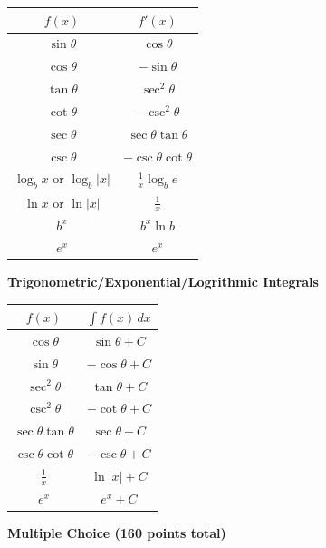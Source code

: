 \documentclass[12pt]{exam}
\newcommand{\<}{\langle}
\renewcommand{\>}{\rangle}
\begin{document}
\begin{center}
\begin{tabular}{c|c}
  \(f(x)\) & \(f'(x)\) \\\hline
  \(\sin\theta\) & \(\cos\theta\) \\
  \(\cos\theta\) & \(-\sin\theta\) \\
  \(\tan\theta\) & \(\sec^2\theta\) \\
  \(\cot\theta\) & \(-\csc^2\theta\) \\
  \(\sec\theta\) & \(\sec\theta\tan\theta\) \\
  \(\csc\theta\) & \(-\csc\theta\cot\theta\) \\
  \(\log_b x\) or \(\log_b|x|\) & \(\frac{1}{x}\log_b e\) \\
  \(\ln x\) or \(\ln|x|\) & \(\frac{1}{x}\) \\
  \(b^x\) & \(b^x\ln b\) \\
  \(e^x\) & \(e^x\)
\end{tabular}
\end{center}

\noindent
\textbf{Trigonometric/Exponential/Logrithmic Integrals}

\begin{center}
\begin{tabular}{c|c}
  \(f(x)\) & \(\int f(x)\,dx\) \\\hline
  \(\cos\theta\) & \(\sin\theta+C\) \\
  \(\sin\theta\) & \(-\cos\theta+C\) \\
  \(\sec^2\theta\) & \(\tan\theta+C\) \\
  \(\csc^2\theta\) & \(-\cot\theta+C\) \\
  \(\sec\theta\tan\theta\) & \(\sec\theta+C\) \\
  \(\csc\theta\cot\theta\) & \(-\csc\theta+C\) \\
  \(\frac{1}{x}\) & \(\ln|x|+C\) \\
  \(e^x\) & \(e^x+C\)
\end{tabular}
\end{center}

\newpage

\begin{center}
  \textbf{Multiple Choice (160 points total)}
\end{center}
\end{document}
